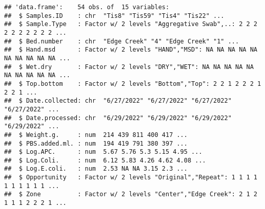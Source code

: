 \documentclass[
]{article}
\newenvironment{Shaded}{\begin{snugshade}}{\end{snugshade}}
\newcommand{\FunctionTok}[1]{\textcolor[rgb]{0.13,0.29,0.53}{\textbf{#1}}}
\newcommand{\NormalTok}[1]{#1}
\newcommand{\OtherTok}[1]{\textcolor[rgb]{0.56,0.35,0.01}{#1}}
\newcommand{\SpecialCharTok}[1]{\textcolor[rgb]{0.81,0.36,0.00}{\textbf{#1}}}
\newcommand{\StringTok}[1]{\textcolor[rgb]{0.31,0.60,0.02}{#1}}
\begin{document}
\begin{Shaded}
\end{Shaded}

\begin{verbatim}
## 'data.frame':    54 obs. of  15 variables:
##  $ Samples.ID    : chr  "Tis8" "Tis59" "Tis4" "Tis22" ...
##  $ Sample.Type   : Factor w/ 2 levels "Aggregative Swab",..: 2 2 2 2 2 2 2 2 2 2 ...
##  $ Bed.number    : chr  "Edge Creek" "4" "Edge Creek" "1" ...
##  $ Hand.msd      : Factor w/ 2 levels "HAND","MSD": NA NA NA NA NA NA NA NA NA NA ...
##  $ Wet.dry       : Factor w/ 2 levels "DRY","WET": NA NA NA NA NA NA NA NA NA NA ...
##  $ Top.bottom    : Factor w/ 2 levels "Bottom","Top": 2 2 1 2 2 2 1 2 2 1 ...
##  $ Date.collected: chr  "6/27/2022" "6/27/2022" "6/27/2022" "6/27/2022" ...
##  $ Date.processed: chr  "6/29/2022" "6/29/2022" "6/29/2022" "6/29/2022" ...
##  $ Weight.g.     : num  214 439 811 400 417 ...
##  $ PBS.added.ml. : num  194 419 791 380 397 ...
##  $ Log.APC.      : num  5.67 5.76 5.3 5.15 4.95 ...
##  $ Log.Coli.     : num  6.12 5.83 4.26 4.62 4.08 ...
##  $ Log.E.coli.   : num  2.53 NA NA 3.15 2.3 ...
##  $ Opportunity   : Factor w/ 2 levels "Original","Repeat": 1 1 1 1 1 1 1 1 1 1 ...
##  $ Zone          : Factor w/ 2 levels "Center","Edge Creek": 2 1 2 1 1 1 2 2 2 1 ...
\end{verbatim}
\end{document}

